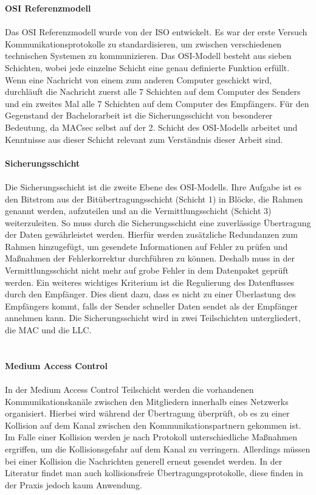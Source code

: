 \textbf{OSI Referenzmodell} \\
\\
Das OSI Referenzmodell wurde von der \gls{ISO} entwickelt. Es war der erste Versuch  Kommunikationsprotokolle zu standardisieren, um zwischen verschiedenen technischen Systemen zu kommunizieren. Das \gls{OSI-Modell} besteht aus sieben Schichten, wobei jede einzelne Schicht eine genau definierte Funktion erfüllt. Wenn eine Nachricht von einem zum anderen Computer geschickt wird, durchläuft die Nachricht zuerst alle 7 Schichten auf dem Computer des Senders und ein zweites Mal alle 7 Schichten auf dem Computer des Empfängers. Für den Gegenstand der Bachelorarbeit ist die Sicherungsschicht von besonderer Bedeutung, da \gls{MACsec} selbst auf der 2. Schicht des \gls{OSI-Modell}s arbeitet und Kenntnisse aus dieser Schicht relevant zum Verständnis dieser Arbeit sind.\\
\\
\textbf{Sicherungsschicht}\\ 
\\
Die Sicherungsschicht ist die zweite Ebene des \gls{OSI-Modell}s. Ihre Aufgabe ist es den Bitstrom aus der Bitübertragungsschicht (Schicht 1) in Blöcke, die Rahmen genannt werden, aufzuteilen und an die Vermittlungsschicht (Schicht 3) weiterzuleiten. So muss durch die Sicherungsschicht eine zuverlässige Übertragung der Daten gewährleistet werden. Hierfür werden zusätzliche Redundanzen zum Rahmen hinzugefügt, um gesendete Informationen auf Fehler zu prüfen und Maßnahmen der Fehlerkorrektur durchführen zu können. Deshalb muss in der Vermittlungsschicht nicht mehr auf grobe Fehler in dem Datenpaket geprüft werden. Ein weiteres wichtiges Kriterium ist die Regulierung des Datenflusses durch den Empfänger. Dies dient dazu, dass es nicht zu einer Überlastung des Empfängers kommt, falls der Sender schneller Daten sendet als der Empfänger annehmen kann. Die Sicherungsschicht wird in zwei Teilschichten untergliedert, die \gls{MAC} und die \gls{LLC}. \\
\\\\
\textbf{Medium Access Control}\\\\
In der Medium Access Control Teilschicht werden die vorhandenen Kommunikationskanäle zwischen den Mitgliedern innerhalb eines Netzwerks organisiert. Hierbei wird während der Übertragung überprüft, ob es zu einer Kollision auf dem Kanal zwischen den Kommunikationspartnern gekommen ist. Im Falle einer Kollision werden je nach Protokoll unterschiedliche Maßnahmen ergriffen, um die Kollisionsgefahr auf dem Kanal zu verringern. Allerdings müssen bei einer Kollision die Nachrichten generell erneut gesendet werden. In der Literatur findet man auch kollisionsfreie Übertragungsprotokolle, diese finden in der Praxis jedoch kaum Anwendung. 
